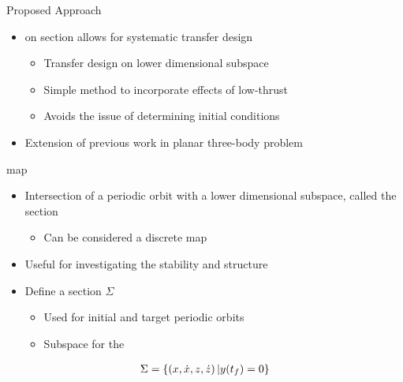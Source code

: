 \begin{frame}{Proposed Approach} %
  \begin{itemize}
      \item {} on \Poincare section allows for systematic transfer design
        \begin{itemize}
            \item Transfer design on lower dimensional subspace
            \item Simple method to incorporate effects of low-thrust 
            \item Avoids the issue of determining initial conditions
        \end{itemize}
        \pause
      \item Extension of previous work in planar three-body problem     
  \end{itemize}

\end{frame} %

\begin{frame}{\Poincare map}
\begin{itemize}
    \item Intersection of a periodic orbit with a lower dimensional subspace, called the \Poincare section
    \pause
        \begin{itemize}
            \item Can be considered a discrete map 
        \end{itemize}
        \pause
    \item Useful for investigating the stability and structure 
    \pause
    \item Define a \Poincare section \( \Sigma \) 
        \begin{itemize}
            \item Used for initial and target periodic orbits
            \item Subspace for the 
        \end{itemize}
\end{itemize}

\begin{align*}
    \Sigma = \left\{ \left( x, \dot{x}, z, \dot{z} \right) | y(t_f) = 0  \right\}
\end{align*}

\end{frame}

